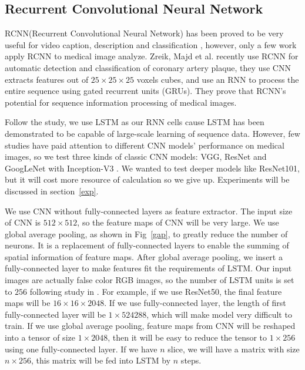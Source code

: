 \documentclass[runningheads]{llncs}
\begin{document}
\subsection{Recurrent Convolutional Neural Network}
\label{RCNN}
RCNN(Recurrent Convolutional Neural Network) has been proved to be very useful for video caption, description and classification \cite{Donahue2015Long}\cite{Aafaq2019Spatio}, however, only a few work apply RCNN to medical image analyze. Zreik, Majd et al. \cite{Zreik2018A} recently use RCNN for automatic detection and classification of coronary artery plaque, they use CNN extracts features out of $ 25\times25\times25$ voxels cubes, and  use an RNN to process the entire sequence using gated recurrent units (GRUs). They prove that RCNN's potential for sequence information processing of medical images.

Follow the study\cite{Donahue2015Long}, we use LSTM as our RNN cells cause LSTM has been demonstrated to be capable of large-scale learning of sequence data. However, few studies have paid attention to different CNN models' performance on medical images, so we test three kinds of classic CNN models: VGG\cite{simonyan2015very}, ResNet\cite{he2016deep} and GoogLeNet with Inception-V3 \cite{szegedy2016rethinking}. 
We wanted to test deeper models like ResNet101, but it will cost more resource of calculation so we give up. Experiments will be discussed in section~\ref{exp}.

We use CNN without fully-connected layers as feature extractor. The input size of CNN is $512 \times 512$, so the feature maps of CNN will be very large. We use global average pooling\cite{lin2014network}, as shown in Fig~\ref{gap}, to greatly reduce the number of neurons. It is a replacement of fully-connected layers to enable the summing of spatial information of feature maps. After global average pooling, we insert a fully-connected layer to make features fit the requirements of LSTM. Our input images are actually false color RGB images, so the number of LSTM units is set to $256$ following study in \cite{Donahue2015Long}.
For example, if we use ResNet50, the final feature maps will be $16 \times 16 \times 2048$. If we use fully-connected layer, the length of first fully-connected layer will be $1 \times 524288$, which will make model very difficult to train. 
If we use global average pooling, feature maps from CNN will be reshaped into a tensor of size $1 \times 2048$, then it will be easy to reduce the tensor to $1 \times 256$ using one fully-connected layer. If we have $n$ slice, we will have a matrix with size $n \times 256$, this matrix will be fed into LSTM by $n$ steps.
\end{document}
